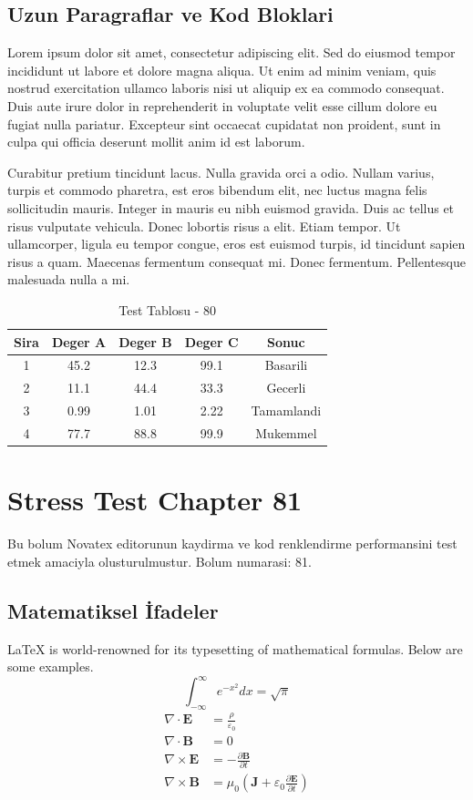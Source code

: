 \documentclass[12pt,a4paper]{article}
\begin{document}
\subsection{Uzun Paragraflar ve Kod Bloklari}
Lorem ipsum dolor sit amet, consectetur adipiscing elit. Sed do eiusmod tempor incididunt ut labore et dolore magna aliqua. Ut enim ad minim veniam, quis nostrud exercitation ullamco laboris nisi ut aliquip ex ea commodo consequat. Duis aute irure dolor in reprehenderit in voluptate velit esse cillum dolore eu fugiat nulla pariatur. Excepteur sint occaecat cupidatat non proident, sunt in culpa qui officia deserunt mollit anim id est laborum.

Curabitur pretium tincidunt lacus. Nulla gravida orci a odio. Nullam varius, turpis et commodo pharetra, est eros bibendum elit, nec luctus magna felis sollicitudin mauris. Integer in mauris eu nibh euismod gravida. Duis ac tellus et risus vulputate vehicula. Donec lobortis risus a elit. Etiam tempor. Ut ullamcorper, ligula eu tempor congue, eros est euismod turpis, id tincidunt sapien risus a quam. Maecenas fermentum consequat mi. Donec fermentum. Pellentesque malesuada nulla a mi.

\begin{table}[h!]
\centering
\begin{tabular}{|c|c|c|c|c|}
\hline
\textbf{Sira} & \textbf{Deger A} & \textbf{Deger B} & \textbf{Deger C} & \textbf{Sonuc} \\
\hline
1 & 45.2 & 12.3 & 99.1 & Basarili \\
2 & 11.1 & 44.4 & 33.3 & Gecerli \\
3 & 0.99 & 1.01 & 2.22 & Tamamlandi \\
4 & 77.7 & 88.8 & 99.9 & Mukemmel \\
\hline
\end{tabular}
\caption{Test Tablosu - 80}
\end{table}

\newpage
\section{Stress Test Chapter 81}
Bu bolum Novatex editorunun kaydirma ve kod renklendirme performansini test etmek amaciyla olusturulmustur. Bolum numarasi: 81.

\subsection{Matematiksel İfadeler}
\LaTeX{} is world-renowned for its typesetting of mathematical formulas. Below are some examples.
\begin{equation}
\int_{-\infty}^{\infty} e^{-x^2} dx = \sqrt{\pi}
\end{equation}
\begin{align}
\nabla \cdot \mathbf{E} &= \frac{\rho}{\varepsilon_0} \\
\nabla \cdot \mathbf{B} &= 0 \\
\nabla \times \mathbf{E} &= -\frac{\partial \mathbf{B}}{\partial t} \\
\nabla \times \mathbf{B} &= \mu_0\left(\mathbf{J} + \varepsilon_0 \frac{\partial \mathbf{E}}{\partial t}\right)
\end{align}
\end{document}
